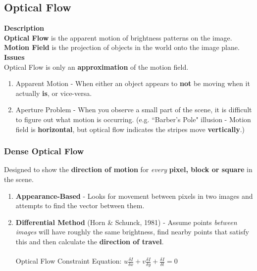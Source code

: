 \documentclass[english, 10pt]{article}
\begin{document}
\subsection{Optical Flow}

\textbf{Description} \\

 \textbf{Optical Flow} is the apparent motion of brightness patterns on the image. \textbf{Motion Field} is the projection of objects in the world onto the image plane. \\

\textbf{Issues} \\

Optical Flow is only an \textbf{approximation} of the motion field.

\begin{enumerate}
\item Apparent Motion - When either an object appears to \textbf{not} be moving when it actually \textbf{is}, or vice-versa.
\item Aperture Problem - When you observe a small part of the scene, it is difficult to figure out what motion is occurring. (e.g. ``Barber's Pole" illusion - Motion field is \textbf{horizontal}, but optical flow indicates the stripes move \textbf{vertically}.) 
\end{enumerate}

\subsubsection{Dense Optical Flow}

Designed to show the \textbf{direction of motion} for \textit{every} \textbf{pixel, block or square} in the scene.

\begin{enumerate}
\item \textbf{Appearance-Based } - Looks for movement between pixels in two images and attempts to find the vector between them. 
\item \textbf{Differential Method} (Horn \& Schunck, 1981) - Assume points \textit{between images} will have roughly the same brightness, find nearby points that satisfy this and then calculate the \textbf{direction of travel}. \\ \\ Optical Flow Constraint Equation:  $u\frac{\delta I}{\delta x} + v\frac{\delta I}{\delta y} + \frac{\delta I}{\delta t} = 0 $
\end{enumerate}
\end{document}

